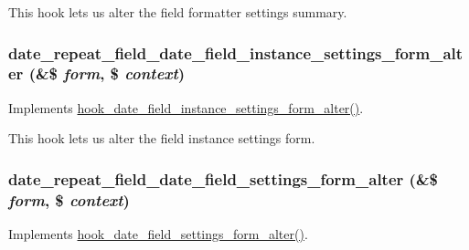 This hook lets us alter the field formatter settings summary. \hypertarget{date__repeat__field_8module_a8e114c2eb4efc5ceaf666b4317792c98}{
\subsubsection[{date\_\-repeat\_\-field\_\-date\_\-field\_\-instance\_\-settings\_\-form\_\-alter}]{\setlength{\rightskip}{0pt plus 5cm}date\_\-repeat\_\-field\_\-date\_\-field\_\-instance\_\-settings\_\-form\_\-alter (\&\$ {\em form}, \/  \$ {\em context})}}
\label{date__repeat__field_8module_a8e114c2eb4efc5ceaf666b4317792c98}
Implements \hyperlink{date_8api_8php_a4dcd88abb62128ef8e63f5d2163f46b3}{hook\_\-date\_\-field\_\-instance\_\-settings\_\-form\_\-alter()}.

This hook lets us alter the field instance settings form. \hypertarget{date__repeat__field_8module_ae99ea1ff99e33265096ccf6f1a2fe1f9}{
\subsubsection[{date\_\-repeat\_\-field\_\-date\_\-field\_\-settings\_\-form\_\-alter}]{\setlength{\rightskip}{0pt plus 5cm}date\_\-repeat\_\-field\_\-date\_\-field\_\-settings\_\-form\_\-alter (\&\$ {\em form}, \/  \$ {\em context})}}
\label{date__repeat__field_8module_ae99ea1ff99e33265096ccf6f1a2fe1f9}
Implements \hyperlink{date_8api_8php_a109a61aa1f6183f9431a4b8e1b929e0b}{hook\_\-date\_\-field\_\-settings\_\-form\_\-alter()}.

